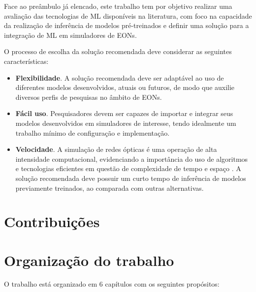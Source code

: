 Face ao preâmbulo já elencado, este trabalho tem por objetivo realizar uma avaliação das tecnologias de ML disponíveis na literatura, com foco na capacidade da realização de inferência de modelos pré-treinados e definir uma solução para a integração de ML em simuladores de EONs.

O processo de escolha da solução recomendada deve considerar as seguintes características:

\begin{itemize}
  \item \textbf{Flexibilidade}. A solução recomendada deve ser adaptável ao uso de diferentes modelos desenvolvidos, atuais ou futuros, de modo que auxilie diversos perfis de pesquisas no âmbito de EONs.
  \item \textbf{Fácil uso}. Pesquisadores devem ser capazes de importar e integrar seus modelos desenvolvidos em simuladores de interesse, tendo idealmente um trabalho mínimo de configuração e implementação.
  \item \textbf{Velocidade}. A simulação de redes ópticas é uma operação de alta intensidade computacional, evidenciando a importância do uso de algoritmos e tecnologias eficientes em questão de complexidade de tempo e espaço \cite{chehab_2019}. A solução recomendada deve possuir um curto tempo de inferência de modelos previamente treinados, ao comparada com outras alternativas.
\end{itemize}

\section{Contribuições}
\label{intro-contributions}



\section{Organização do trabalho}
\label{intro-org}

O trabalho está organizado em 6 capítulos com os seguintes propósitos:

